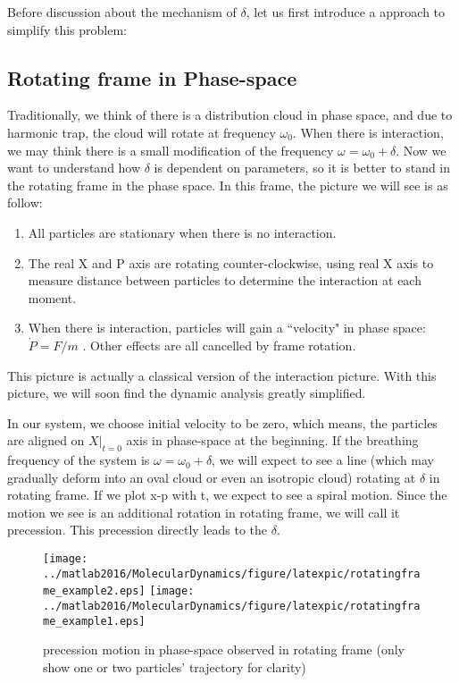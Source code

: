 \documentclass[a4paper,onecolumn,12pt]{article}
\begin{document}
Before discussion about the mechanism of $\delta$, let us first introduce a approach to simplify this problem:

\subsection{Rotating frame in Phase-space}
Traditionally, we think of there is a distribution cloud in phase space, and due to harmonic trap, the cloud will rotate at frequency $\omega_0$. When there is interaction, we may think there is a small modification of the frequency $\omega=\omega_0+\delta$. Now we want to understand how $\delta$ is dependent on parameters, so it is better to stand in the rotating frame in the phase space. In this frame, the picture we will see is as follow:\\
\begin{enumerate}[\textbf{*}]
\item All particles are stationary when there is no interaction.
\item The real X and P axis are rotating counter-clockwise, using real X axis to measure distance between particles to determine the interaction at each moment.
\item When there is interaction, particles will gain a ``velocity" in phase space: $\dot{P}=F/m$ . Other effects are all cancelled by frame rotation.
\end{enumerate}


This picture is actually a classical version of the interaction picture. With this picture, we will soon find the dynamic analysis greatly simplified.

In our system, we choose initial velocity to be zero, which means, the particles are aligned on $X|_{t=0}$ axis in phase-space at the beginning. If the breathing frequency of the system is $\omega=\omega_0+\delta$, we will expect to see a line (which may gradually deform into an oval cloud or even an isotropic cloud) rotating at $\delta$ in rotating frame. If we plot x-p with t, we expect to see a spiral motion. Since the motion we see is an additional rotation in rotating frame, we will call it precession. This precession directly leads to the $\delta$.


\begin{figure}[hbtp]
\centering
\texttt{[image: ../matlab2016/MolecularDynamics/figure/latexpic/rotatingframe\_example2.eps]} 
\texttt{[image: ../matlab2016/MolecularDynamics/figure/latexpic/rotatingframe\_example1.eps]} 
\caption{precession motion in phase-space observed in rotating frame (only show one or two particles' trajectory for clarity)}
\label{Breathingfrequency2}
\end{figure}
\end{document}
